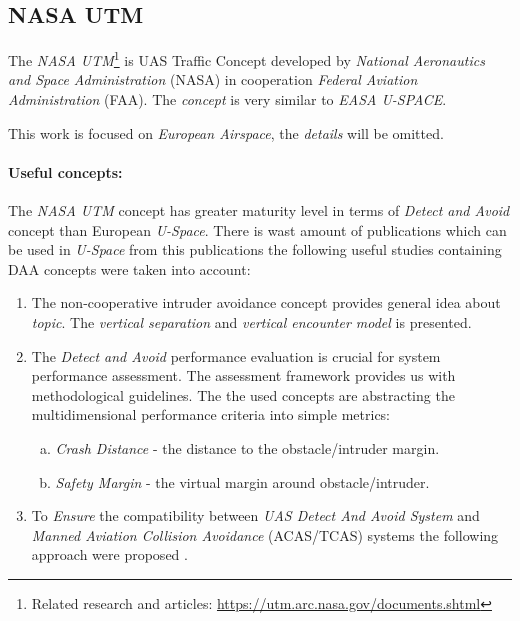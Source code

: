 \subsection{NASA UTM}\label{sec:NASAUtm}

\noindent The \emph{NASA UTM}\footnote{Related research and articles: \url{https://utm.arc.nasa.gov/documents.shtml}} is UAS Traffic Concept developed by \emph{National Aeronautics and Space Administration} (NASA) in cooperation \emph{Federal Aviation Administration} (FAA). The \emph{concept} is very similar to \emph{EASA U-SPACE}.

\begin{note}
    This work is focused on \emph{European Airspace}, the \emph{details} will be omitted. 
\end{note}

\paragraph{Useful concepts:} The \emph{NASA UTM} concept has greater maturity level in terms of \emph{Detect and Avoid} concept than European \emph{U-Space}. There is wast amount of publications which can be used in \emph{U-Space} from this publications the following useful studies containing DAA concepts were taken into account:

\begin{enumerate}    
    \item The non-cooperative intruder avoidance concept \cite{cone2017uas} provides general idea about \emph{topic}. The \emph{vertical separation} and \emph{vertical encounter model} is presented.
    
    \item The \emph{Detect and Avoid} performance evaluation is crucial for system performance assessment. The assessment framework \cite{lee2016wide} provides us with methodological guidelines. The the used concepts are abstracting the multidimensional performance criteria into simple metrics:
    
    \begin{enumerate}[a.]
        \item \emph{Crash Distance} - the distance to the obstacle/intruder margin.
        
        \item \emph{Safety Margin} - the virtual margin around obstacle/intruder.
    \end{enumerate}
    
    \item To \emph{Ensure} the compatibility between \emph{UAS Detect And Avoid System} and \emph{Manned Aviation Collision Avoidance} (ACAS/TCAS) systems the following approach were proposed \cite{thipphavong2017ensuring}.
\end{enumerate}
